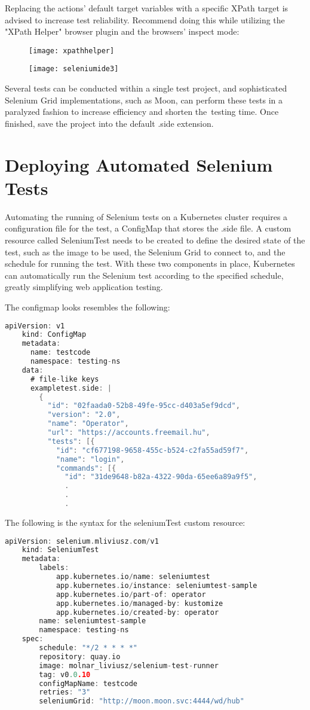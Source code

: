Replacing the actions' default target variables with a specific XPath target is advised to increase test reliability. Recommend doing this while utilizing the "XPath Helper" browser plugin and the browsers' inspect mode:

\begin{figure}[H]
	\centering
	\texttt{[image: xpathhelper]}
	\label{fig:xpathhelper}
\end{figure}

\begin{figure}[H]
	\centering
	\texttt{[image: seleniumide3]}
	\label{fig:seleniumide3}
\end{figure}

Several tests can be conducted within a single test project, and sophisticated Selenium Grid implementations, such as Moon, can perform these tests in a paralyzed fashion to increase efficiency and shorten the testing time. Once finished, save the project into the default .side extension.

\section{Deploying Automated Selenium Tests}

Automating the running of Selenium tests on a Kubernetes cluster requires a configuration file for the test, a ConfigMap that stores the .side file. A custom resource called SeleniumTest needs to be created to define the desired state of the test, such as the image to be used, the Selenium Grid to connect to, and the schedule for running the test. With these two components in place, Kubernetes can automatically run the Selenium test according to the specified schedule, greatly simplifying web application testing.

The configmap looks resembles the following:
\begin{lstlisting}[language={Go}]
	apiVersion: v1
	kind: ConfigMap
	metadata:
	  name: testcode
	  namespace: testing-ns
	data:
	  # file-like keys
	  exampletest.side: |
		{
		  "id": "02faada0-52b8-49fe-95cc-d403a5ef9dcd",
		  "version": "2.0",
		  "name": "Operator",
		  "url": "https://accounts.freemail.hu",
		  "tests": [{
			"id": "cf677198-9658-455c-b524-c2fa55ad59f7",
			"name": "login",
			"commands": [{
			  "id": "31de9648-b82a-4322-90da-65ee6a89a9f5",
			  .
			  .
			  .
\end{lstlisting}

The following is the syntax for the seleniumTest custom resource:
\begin{lstlisting}[language={Go}]
	apiVersion: selenium.mliviusz.com/v1
	kind: SeleniumTest
	metadata:
		labels:
			app.kubernetes.io/name: seleniumtest
			app.kubernetes.io/instance: seleniumtest-sample
			app.kubernetes.io/part-of: operator
			app.kubernetes.io/managed-by: kustomize
			app.kubernetes.io/created-by: operator
		name: seleniumtest-sample
		namespace: testing-ns
	spec:
		schedule: "*/2 * * * *"
		repository: quay.io
		image: molnar_liviusz/selenium-test-runner
		tag: v0.0.10
		configMapName: testcode
		retries: "3"
		seleniumGrid: "http://moon.moon.svc:4444/wd/hub"
\end{lstlisting}

